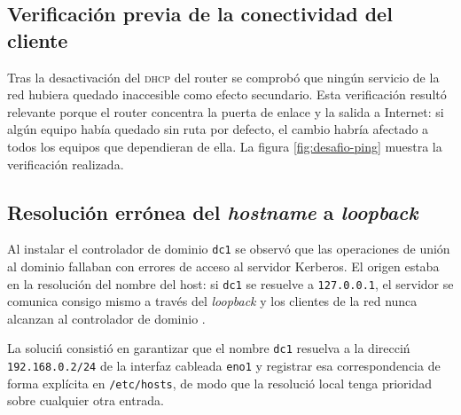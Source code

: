 \subsection{Verificaci\'on previa de la conectividad del cliente}

Tras la desactivaci\'on del \textsc{dhcp} del router se comprob\'o que
ning\'un servicio de la red hubiera quedado inaccesible como efecto
secundario. Esta verificaci\'on result\'o relevante porque el router
concentra la puerta de enlace y la salida a Internet: si alg\'un equipo
hab\'ia quedado sin ruta por defecto, el cambio habr\'ia afectado a todos
los equipos que dependieran de ella. La figura \ref{fig:desafio-ping}
muestra la verificaci\'on realizada.


\subsection{Resoluci\'on err\'onea del \textit{hostname} a \textit{loopback}}

Al instalar el controlador de dominio \texttt{dc1} se observ\'o que las
operaciones de uni\'on al dominio fallaban con errores de acceso al
servidor Kerberos. El origen estaba en la resoluci\'on del nombre del host:
si \texttt{dc1} se resuelve a \texttt{127.0.0.1}, el servidor se comunica
consigo mismo a trav\'es del \textit{loopback} y los clientes de la red
nunca alcanzan al controlador de dominio \cite{sambateam2024}.

La soluci\'n consisti\'o en garantizar que el nombre \texttt{dc1} resuelva a
la direcci\'n \texttt{192.168.0.2/24} de la interfaz cableada \texttt{eno1}
y registrar esa correspondencia de forma explícita en \texttt{/etc/hosts},
de modo que la resoluci\'o local tenga prioridad sobre cualquier otra
entrada.


